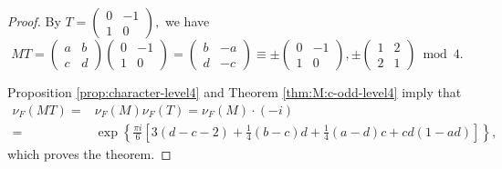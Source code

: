 \documentclass[10pt,a4paper]{amsart}
\begin{document}
\begin{proof}
By 
$
T
=
\begin{pmatrix}
0 & -1 \\
1 & 0
\end{pmatrix}, 
$ 
we have 
\begin{equation*}
MT
=
\begin{pmatrix}
a & b \\
c & d
\end{pmatrix}
\begin{pmatrix}
0 & -1 \\
1 & 0
\end{pmatrix}
=
\begin{pmatrix}
b & -a \\
d & -c
\end{pmatrix}
\equiv
\pm
\begin{pmatrix}
0 & -1 \\
1 & 0
\end{pmatrix},
\pm
 \begin{pmatrix}
1 & 2 \\
2 & 1
\end{pmatrix}
\bmod{4}.
\end{equation*}
\par
Proposition \ref{prop:character-level4} and Theorem \ref{thm:M:c-odd-level4}
imply that 
\begin{align*}
\nu_{F}(MT)=&\nu_{F}(M)\nu_{F}(T)=\nu_{F}(M)\cdot(-i)  \\
=&
\exp
\left\{
\frac{\pi i}{6}
\left[
3(d-c-2)+\frac14(b-c)d+\frac14(a-d)c+cd(1-ad)
\right]
\right\},
\end{align*}
which proves the theorem. 
\end{proof}
\end{document}
